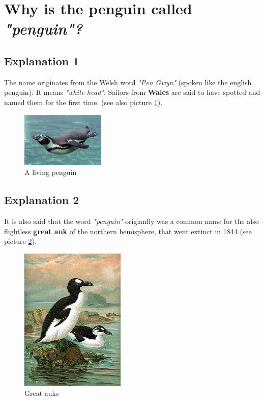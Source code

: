 \section{Why is the penguin called \emph{"penguin"?}}
\subsection{Explanation 1}
The name originates from the Welsh word \emph{"Pen Gwyn"} (spoken like the english penguin). It means \emph{"white head"}. Sailors from \textbf{Wales} are said to have spotted and named them for the first time. (see also picture \ref{img:pen}).

\begin{figure}[H]
\begin{center}
\includegraphics[width=4cm]{images/swim-Ping.jpg}
\caption{A living penguin}
\label{img:pen}
\end{center}
\end{figure}

\subsection{Explanation 2}
It is also said that the word \emph{"penguin"} origianlly was a common name for the also flightless \textbf{great auk} of the northern hemisphere, that went extinct in 1844 (see picture \ref{img:auk}).

\begin{figure}[H]
\begin{center}
\includegraphics[width=5cm]{images/GreatAuk.jpg}
\caption{Great auks}
\label{img:auk}
\end{center}
\end{figure}

